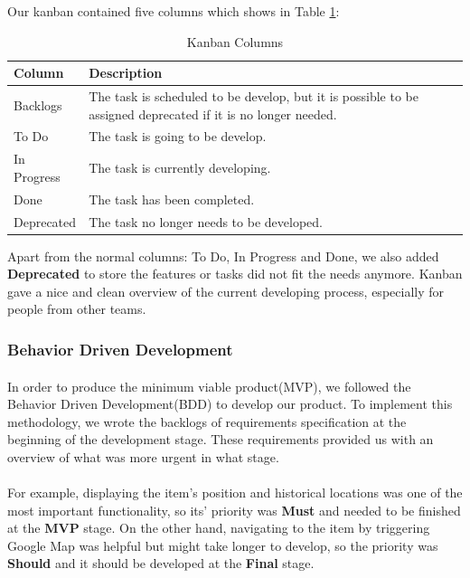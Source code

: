 \documentclass[12pt,a4paper]{article}
\begin{document}
          Our kanban contained five columns which shows in Table \ref{table:Kanban Columns}:
          
          \begin{table}[H]
            \centering
              \begin{tabularx}{\textwidth}{l X}
                \hline
                Column & Description  \\ \hline
                Backlogs & The task is scheduled to be develop, but it is possible to be assigned deprecated if it is no longer needed. \\ 
                To Do & The task is going to be develop.  \\ 
                In Progress & The task is currently developing.  \\ 
                Done & The task has been completed.   \\ 
                Deprecated & The task no longer needs to be developed.\\                  
                \hline
              \end{tabularx}
              \caption[Table caption text]{Kanban Columns}
              \label{table:Kanban Columns}
          \end{table}
          
          Apart from the normal columns: To Do, In Progress and Done, we also added {\bf Deprecated} to store the features or tasks did not fit the needs anymore. Kanban gave a nice and clean overview of the current developing process, especially for people from other teams.
        
        \subsubsection{Behavior Driven Development}
          \paragraph{}In order to produce the minimum viable product(MVP), we followed the Behavior Driven Development(BDD) to develop our product. To implement this methodology, we wrote the backlogs of requirements specification at the beginning of the development stage. These requirements provided us with an overview of what was more urgent in what stage. 

          \paragraph{}For example, displaying the item's position and historical locations was one of the most important functionality, so its' priority was {\bf Must} and needed to be finished at the {\bf MVP} stage. On the other hand, navigating to the item by triggering Google Map was helpful but might take longer to develop, so the priority was {\bf Should} and it should be developed at the {\bf Final} stage. 
          
\end{document}
